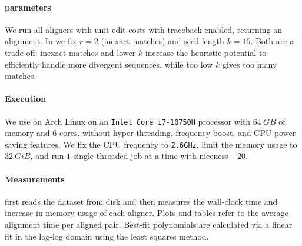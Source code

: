\paragraph{\astarpa parameters}
We run all aligners with unit edit costs with traceback enabled, returning an
alignment. In \astarpa we fix $r{=}2$ (inexact matches) and seed length
$k{=}15$. Both are a trade-off: inexact matches and lower $k$ increase the
heuristic potential to efficiently handle more divergent sequences, while too
low $k$ gives too many matches.

\paragraph{Execution}
We use
\pabench
on Arch Linux on an \texttt{Intel Core i7-10750H} processor with $\qty{64}{GB}$
of memory and $6$ cores, without hyper-threading, frequency boost, and CPU power saving
features. We fix the CPU frequency to \texttt{2.6GHz}, limit the memory usage to
$\qty{32}{GiB}$, and run $1$ single-threaded job at a time with niceness $-20$.

\paragraph{Measurements}
\pabench first reads the dataset from disk and then measures the wall-clock time
and increase in memory usage of each aligner. Plots and tables refer to the
average alignment time per aligned pair. Best-fit polynomials are calculated via
a linear fit in the log-log domain using the least squares method.

